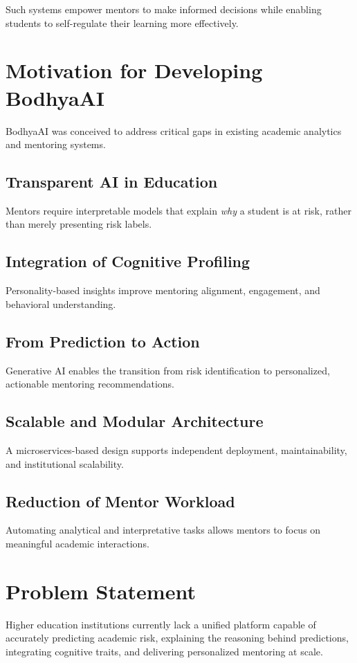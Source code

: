 \documentclass[12pt,a4paper]{report}
\begin{document}
Such systems empower mentors to make informed decisions while enabling students to self-regulate their learning more effectively.

\section{Motivation for Developing BodhyaAI}

BodhyaAI was conceived to address critical gaps in existing academic analytics and mentoring systems.

\subsection{Transparent AI in Education}
Mentors require interpretable models that explain \textit{why} a student is at risk, rather than merely presenting risk labels.

\subsection{Integration of Cognitive Profiling}
Personality-based insights improve mentoring alignment, engagement, and behavioral understanding.

\subsection{From Prediction to Action}
Generative AI enables the transition from risk identification to personalized, actionable mentoring recommendations.

\subsection{Scalable and Modular Architecture}
A microservices-based design supports independent deployment, maintainability, and institutional scalability.

\subsection{Reduction of Mentor Workload}
Automating analytical and interpretative tasks allows mentors to focus on meaningful academic interactions.

\section{Problem Statement}

Higher education institutions currently lack a unified platform capable of accurately predicting academic risk, explaining the reasoning behind predictions, integrating cognitive traits, and delivering personalized mentoring at scale.
\end{document}
